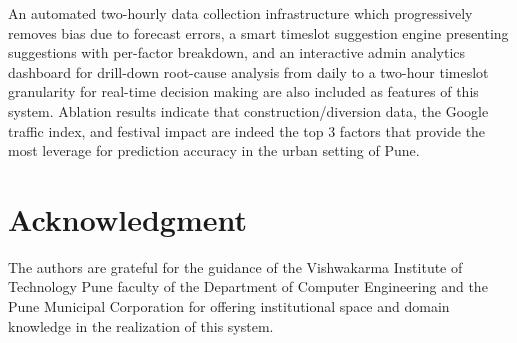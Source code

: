 \documentclass[conference]{IEEEtran}
\begin{document}
An automated two-hourly data collection infrastructure which progressively removes bias due to forecast errors, a smart timeslot suggestion engine presenting suggestions with per-factor breakdown, and an interactive admin analytics dashboard for drill-down root-cause analysis from daily to a two-hour timeslot granularity for real-time decision making are also included as features of this system. Ablation results indicate that construction/diversion data, the Google traffic index, and festival impact are indeed the top 3 factors that provide the most leverage for prediction accuracy in the urban setting of Pune.

\section*{Acknowledgment}

The authors are grateful for the guidance of the Vishwakarma Institute of Technology Pune faculty of the Department of Computer Engineering and the Pune Municipal Corporation for offering institutional space and domain knowledge in the realization of this system.
\end{document}

